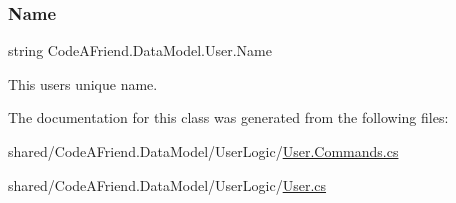 \subsubsection{\texorpdfstring{Name}{Name}}
{\footnotesize\ttfamily string Code\+A\+Friend.\+Data\+Model.\+User.\+Name\hspace{0.3cm}{\ttfamily [get]}}



This user\textquotesingle{}s unique name.



The documentation for this class was generated from the following files\+:\begin{DoxyCompactItemize}
\item 
shared/\+Code\+A\+Friend.\+Data\+Model/\+User\+Logic/\mbox{\hyperlink{_user_8_commands_8cs}{User.\+Commands.\+cs}}\item 
shared/\+Code\+A\+Friend.\+Data\+Model/\+User\+Logic/\mbox{\hyperlink{_user_8cs}{User.\+cs}}\end{DoxyCompactItemize}
